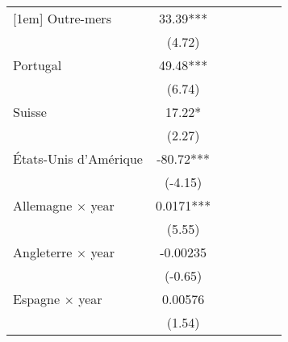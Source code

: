 {\begin{tabular}{l*{6}{c}}
[1em]
Outre-mers          &       33.39***&                     &                     &                     &                     &                     \\
                    &      (4.72)         &                     &                     &                     &                     &                     \\
[1em]
Portugal            &       49.48***&                     &                     &                     &                     &                     \\
                    &      (6.74)         &                     &                     &                     &                     &                     \\
[1em]
Suisse              &       17.22*  &                     &                     &                     &                     &                     \\
                    &      (2.27)         &                     &                     &                     &                     &                     \\
[1em]
États-Unis d'Amérique&      -80.72***&                     &                     &                     &                     &                     \\
                    &     (-4.15)         &                     &                     &                     &                     &                     \\
[1em]
Allemagne $\times$ year&      0.0171***&                     &                     &                     &                     &                     \\
                    &      (5.55)         &                     &                     &                     &                     &                     \\
[1em]
Angleterre $\times$ year&    -0.00235         &                     &                     &                     &                     &                     \\
                    &     (-0.65)         &                     &                     &                     &                     &                     \\
[1em]
Espagne $\times$ year&     0.00576         &                     &                     &                     &                     &                     \\
                    &      (1.54)         &                     &                     &                     &                     &                     \\

\end{tabular}}
